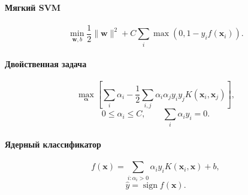 \documentclass[12pt,a4paper]{article}
\theoremstyle{definition}
\newcommand{\1}{\mathbf{1}}
\DeclareMathOperator{\sign}{sign}
\begin{document}
\paragraph{Мягкий SVM}
\[
    \min_{\bm{w},b}
    \frac{1}{2}\|\bm{w}\|^2
    +
    C\sum_i
    \max(0,1-y_if(\bm{x}_i)).
\]

\paragraph{Двойственная задача}
\[
    \max_{\bm{\alpha}}
    \left[
        \sum_i\alpha_i
        -
        \frac{1}{2}
        \sum_{i,j}
        \alpha_i\alpha_jy_iy_jK(\bm{x}_i,\bm{x}_j)
    \right],
\]
\[
    0\leq\alpha_i\leq C,
    \qquad
    \sum_i\alpha_i y_i=0.
\]

\paragraph{Ядерный классификатор}
\[
    f(\bm{x})
    =
    \sum_{i:\alpha_i>0}
    \alpha_i y_iK(\bm{x}_i,\bm{x})
    +
    b,
\]
\[
    \widehat{y}=\sign f(\bm{x}).
\]
\end{document}
